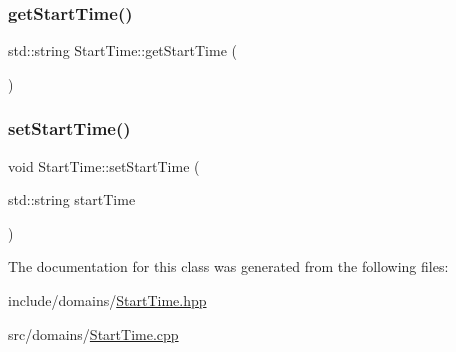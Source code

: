 \subsubsection{\texorpdfstring{getStartTime()}{getStartTime()}}
{\footnotesize\ttfamily std\+::string Start\+Time\+::get\+Start\+Time (\begin{DoxyParamCaption}{ }\end{DoxyParamCaption})}

\mbox{\label{class_start_time_ad6692d66a7c97d3a58f6d7b5b56880bc}} 
\subsubsection{\texorpdfstring{setStartTime()}{setStartTime()}}
{\footnotesize\ttfamily void Start\+Time\+::set\+Start\+Time (\begin{DoxyParamCaption}\item[{std\+::string}]{start\+Time }\end{DoxyParamCaption})}



The documentation for this class was generated from the following files\+:\begin{DoxyCompactItemize}
\item 
include/domains/\mbox{\hyperlink{_start_time_8hpp}{Start\+Time.\+hpp}}\item 
src/domains/\mbox{\hyperlink{_start_time_8cpp}{Start\+Time.\+cpp}}\end{DoxyCompactItemize}
